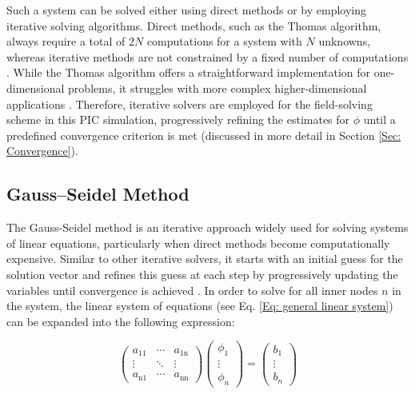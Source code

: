 Such a system can be solved either using direct methods or by employing iterative solving algorithms. 
Direct methods, such as the Thomas algorithm, always require a total of $2N$ computations for a system with $N$ unknowns, whereas iterative methods are not constrained by a fixed number of computations \cite{brieda_plasma_2019}. While the Thomas algorithm offers a straightforward implementation for one-dimensional problems, it struggles with more complex higher-dimensional applications \cite{brieda_plasma_2019}. Therefore, iterative solvers are employed for the field-solving scheme in this \acs{PIC} simulation, progressively refining the estimates for $\phi$ until a predefined convergence criterion is met (discussed in more detail in Section \ref{Sec: Convergence}).
\begin{comment}

\begin{align}
f(x+\Delta x) &= f(x) + \frac{\Delta x}{1!}\frac{\partial f}{\partial x} + \frac{(\Delta x)^2}{2!}\frac{\partial^2 f}{\partial x^2} + \frac{(\Delta x)^3}{3!}\frac{\partial^3 f}{\partial x^3} + \cdots\\
f(x-\Delta x) &= f(x) - \frac{\Delta x}{1!}\frac{\partial f}{\partial x} + \frac{(\Delta x)^2}{2!}\frac{\partial^2 f}{\partial x^2} - \frac{(\Delta x)^3}{3!}\frac{\partial^3 f}{\partial x^3} + \cdots
\end{align}


wegen boundary eigene Gleichung 
\end{comment}
\subsection{Gauss–Seidel Method}
\label{Sec: Gauss Seidel Method}
The Gauss-Seidel method is an iterative approach widely used for solving systems of linear equations, particularly when direct methods become computationally expensive. Similar to other iterative solvers, it starts with an initial guess for the solution vector and refines this guess at each step by progressively updating the variables until convergence is achieved \cite{sauer_numerical_2012}. In order to solve for all inner nodes $n$ in the system, the linear system of equations (see Eq. \ref{Eq: general linear system}) can be expanded into the following expression:

\begin{equation}
\begin{pmatrix}
a_{11} & \cdots & a_{1 \mathrm{n}}\\
\vdots & \ddots & \vdots\\
a_{\mathrm{n}1} & \cdots & a_{\mathrm{nn}}
\end{pmatrix}
\begin{pmatrix}
\phi_1 \\
\vdots\\
\phi_n
\end{pmatrix}
=
\begin{pmatrix}
b_1 \\
\vdots\\
b_n
\end{pmatrix}
\end{equation}

